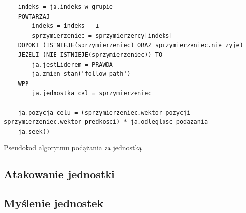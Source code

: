 \begin{table}
\begin{center}
\begin{lstlisting}
	indeks = ja.indeks_w_grupie
	POWTARZAJ
		indeks = indeks - 1
		sprzymierzeniec = sprzymierzency[indeks]
	DOPOKI (ISTNIEJE(sprzymierzeniec) ORAZ sprzymierzeniec.nie_zyje)
	JEZELI (NIE_ISTNIEJE(sprzymierzeniec)) TO
		ja.jestLiderem = PRAWDA
		ja.zmien_stan('follow path')
	WPP
		ja.jednostka_cel = sprzymierzeniec

	ja.pozycja_celu = (sprzymierzeniec.wektor_pozycji - sprzymierzeniec.wektor_predkosci) * ja.odleglosc_podazania
	ja.seek()
\end{lstlisting}
\caption {Pseudokod algorytmu podążania za jednostką}
\label{followEntityCode}
\end{center}
\end{table}

\subsection{Atakowanie jednostki}
\subsection{Myślenie jednostek}

